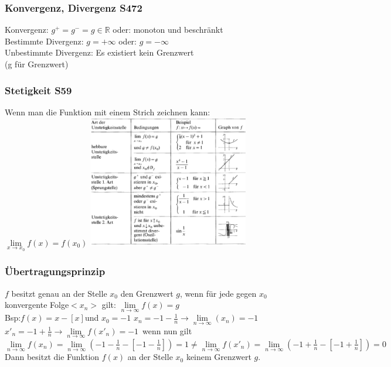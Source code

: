 \begin{multicols}{2}
\subsubsection{Konvergenz, Divergenz \color{red}S472}
Konvergenz: $ g^{+}=g^{-}=g \in  \mathbb R $ oder: monoton und beschränkt\\
Bestimmte Divergenz: $ g=+\infty $ oder: $ g=-\infty$\\
Unbestimmte Divergenz: Es existiert kein Grenzwert\\
(g für Grenzwert)

\subsubsection{Stetigkeit \color{red}S59}
Wenn man die Funktion mit einem Strich zeichnen kann:\\
$ \lim\limits_{x\to x_{0}}f(x) = f(x_{0})$
\includegraphics[width=7cm]{images/Unstetig.PNG}\\

\end{multicols}

\subsubsection{Übertragungsprinzip}
$f$ besitzt genau an der Stelle $x_{0}$ den Grenzwert $g$, wenn für jede gegen $x_{0}$ konvergente Folge$<x_{n}>$ gilt: $\lim\limits_{n\to\infty}f(x)=g$\\
Bsp:$f(x)=x-[x]$und $x_{0}=-1$ \qquad\qquad $x_{n}=-1-\frac{1}{n}\rightarrow \lim\limits_{n\to\infty}(x_{n})=-1$ \qquad\qquad $x'_{n}= -1+\frac{1}{n}\rightarrow \lim\limits_{n\to\infty}f(x'_{n})=-1$\
wenn nun gilt\\
$ \lim\limits_{n\to\infty}f(x_{n})= \lim\limits_{n\to\infty}(-1-\frac{1}{n}-[-1-\frac{1}{n}])=1\neq \lim\limits_{n\to\infty}f(x'_{n})=\lim\limits_{n\to\infty}(-1+\frac{1}{n}-[-1+\frac{1}{n}])=0$\\
Dann besitzt die Funktion $f(x)$ an der Stelle $x_{0}$ keinem Grenzwert $g$.

